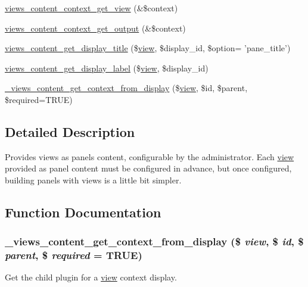 \begin{DoxyCompactItemize}
\item 
\hyperlink{views__content_8module_a456bb2978f9dc8b22cde2975cb417a6a}{views\_\-content\_\-context\_\-get\_\-view} (\&\$context)
\item 
\hyperlink{views__content_8module_ae13ab6888acce2fe7a74aa935ab2422c}{views\_\-content\_\-context\_\-get\_\-output} (\&\$context)
\item 
\hyperlink{views__content_8module_afc263b5835dd62ae6774d8720b983a29}{views\_\-content\_\-get\_\-display\_\-title} (\$\hyperlink{classview}{view}, \$display\_\-id, \$option= 'pane\_\-title')
\item 
\hyperlink{views__content_8module_a6f9d793243f30134f214f74c1b3c3da5}{views\_\-content\_\-get\_\-display\_\-label} (\$\hyperlink{classview}{view}, \$display\_\-id)
\item 
\hyperlink{views__content_8module_a7c2fbb7bd5d19669ba41a1fa77a3bb36}{\_\-views\_\-content\_\-get\_\-context\_\-from\_\-display} (\$\hyperlink{classview}{view}, \$id, \$parent, \$required=TRUE)
\end{DoxyCompactItemize}


\subsection{Detailed Description}
Provides views as panels content, configurable by the administrator. Each \hyperlink{classview}{view} provided as panel content must be configured in advance, but once configured, building panels with views is a little bit simpler. 

\subsection{Function Documentation}
\hypertarget{views__content_8module_a7c2fbb7bd5d19669ba41a1fa77a3bb36}{
\subsubsection[{\_\-views\_\-content\_\-get\_\-context\_\-from\_\-display}]{\setlength{\rightskip}{0pt plus 5cm}\_\-views\_\-content\_\-get\_\-context\_\-from\_\-display (\$ {\em view}, \/  \$ {\em id}, \/  \$ {\em parent}, \/  \$ {\em required} = {\ttfamily TRUE})}}
\label{views__content_8module_a7c2fbb7bd5d19669ba41a1fa77a3bb36}
Get the child plugin for a \hyperlink{classview}{view} context display.


